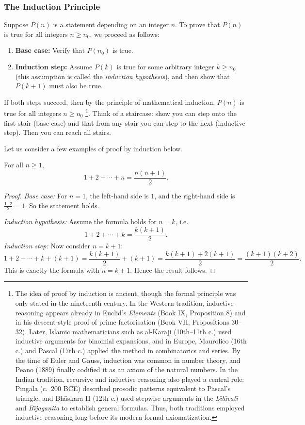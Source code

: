 \subsubsection*{The Induction Principle}
Suppose $P(n)$ is a statement depending on an integer $n$. To prove that 
$P(n)$ is true for all integers $n \geq n_0$, we proceed as follows:
\begin{enumerate}
    \item \textbf{Base case:} Verify that $P(n_0)$ is true.
    \item \textbf{Induction step:} Assume $P(k)$ is true for some arbitrary 
          integer $k \geq n_0$ (this assumption is called the \emph{induction hypothesis}), 
          and then show that $P(k+1)$ must also be true.
\end{enumerate}
If both steps succeed, then by the principle of mathematical induction, $P(n)$
is true for all integers $n \geq n_0$ \footnote{ The idea of proof by induction is ancient, though the formal principle was 
only stated in the nineteenth century. In the Western tradition, inductive 
reasoning appears already in Euclid's \emph{Elements} (Book IX, Proposition 8) 
and in his descent-style proof of prime factorisation (Book VII, Propositions 
30--32). Later, Islamic mathematicians such as al-Karaji 
(10th--11th c.) used inductive arguments for binomial expansions, 
and in Europe, Maurolico (16th c.) and Pascal (17th c.) applied the method in 
combinatorics and series. By the time of Euler and 
Gauss, induction was common in number theory, and Peano (1889) finally codified 
it as an axiom of the natural numbers. In the Indian tradition, 
recursive and inductive reasoning also played a central role: Pingala 
(c.\ 200 BCE) described prosodic patterns equivalent to Pascal's triangle, and Bh\={a}skara II (12th c.) used stepwise arguments in the 
\emph{L\={\i}l\={a}vat\={\i}} and \emph{B\={\i}jaga\d{n}ita} to establish general 
formulas. Thus, both traditions employed inductive reasoning 
long before its modern formal axiomatization.}.  Think of a staircase: show you can step onto the first stair (base case) and that from any stair you can step to the next (inductive step). Then you can reach all stairs.


Let us consider a few examples of proof by induction below.

\begin{theorem}
For all $n \geq 1$,
\[
1 + 2 + \cdots + n = \frac{n(n+1)}{2}.
\]
\end{theorem}
\begin{proof}

\noindent
\emph{Base case:} For $n=1$, the left-hand side is $1$, and the right-hand side 
is $\frac{1 \cdot 2}{2} = 1$. So the statement holds.

\noindent
\emph{Induction hypothesis:} Assume the formula holds for $n=k$, i.e.
\[
1 + 2 + \cdots + k = \frac{k(k+1)}{2}.
\]
\noindent
\emph{Induction step:} Now consider $n=k+1$:
\[
1+2+\cdots+k+(k+1) 
= \frac{k(k+1)}{2} + (k+1)
= \frac{k(k+1)+2(k+1)}{2}
= \frac{(k+1)(k+2)}{2}.
\]
This is exactly the formula with $n=k+1$. Hence the result follows.
\end{proof}


